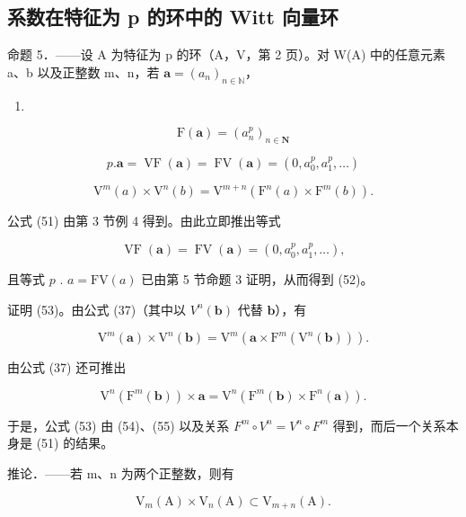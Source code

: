 \subsection{系数在特征为 p 的环中的 Witt 向量环}

命题 5．——设 A 为特征为 p 的环（A，V，第 2 页）。对 W(A) 中的任意元素 a、b 以及正整数 m、n，若 \(\boldsymbol{a} = (a_{n})_{n \in \mathbb{N}}\)，

\begin{enumerate}
\def\labelenumi{(\arabic{enumi})}
\setcounter{enumi}{50}
\tightlist
\item
\end{enumerate}

\[
\mathrm{F} (\boldsymbol {a}) = (a _ {n} ^ {p}) _ {n \in \mathbf {N}}\tag{52}
\]

\[
p. \boldsymbol {a} = \operatorname{VF} (\boldsymbol {a}) = \operatorname{FV} (\boldsymbol {a}) = (0, a _ {0} ^ {p}, a _ {1} ^ {p}, \dots)\tag{53}
\]

\[
\mathrm{V} ^ {m} (a) \times \mathrm{V} ^ {n} (b) = \mathrm{V} ^ {m + n} (\mathrm{F} ^ {n} (a) \times \mathrm{F} ^ {m} (b)).
\]

公式 (51) 由第 3 节例 4 得到。由此立即推出等式

\[
\operatorname{VF} (\boldsymbol {a}) = \operatorname{FV} (\boldsymbol {a}) = (0, a _ {0} ^ {p}, a _ {1} ^ {p}, \dots),
\]

且等式 \(p\) . \(a = \text{FV}(a)\) 已由第 5 节命题 3 证明，从而得到 (52)。

证明 (53)。由公式 (37)（其中以 \(V^n(\boldsymbol{b})\) 代替 \(\boldsymbol{b}\)），有

\[
\mathrm{V} ^ {m} (\boldsymbol {a}) \times \mathrm{V} ^ {n} (\boldsymbol {b}) = \mathrm{V} ^ {m} \left(\boldsymbol {a} \times \mathrm{F} ^ {m} \left(\mathrm{V} ^ {n} (\boldsymbol {b})\right)\right).\tag{54}
\]

由公式 (37) 还可推出

\[
\mathrm{V} ^ {n} \left(\mathrm{F} ^ {m} (\boldsymbol {b})\right) \times \boldsymbol {a} = \mathrm{V} ^ {n} \left(\mathrm{F} ^ {m} (\boldsymbol {b}) \times \mathrm{F} ^ {n} (\boldsymbol {a})\right).\tag{55}
\]

于是，公式 (53) 由 (54)、(55) 以及关系 \(F^{m} \circ V^{n} = V^{n} \circ F^{m}\) 得到，而后一个关系本身是 (51) 的结果。

推论．——若 m、n 为两个正整数，则有

\[
\mathrm{V} _ {m} (\mathrm{A}) \times \mathrm{V} _ {n} (\mathrm{A}) \subset \mathrm{V} _ {m + n} (\mathrm{A}).
\]

